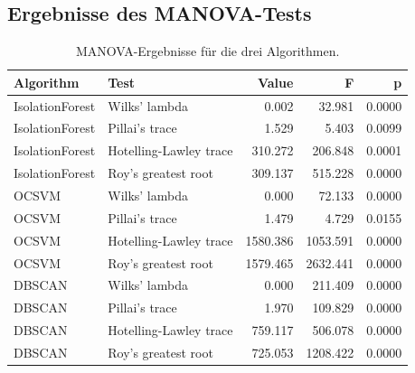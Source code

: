 \documentclass[a4paper,12pt]{article}
\begin{document}
	\subsection{Ergebnisse des MANOVA-Tests}
	\begin{table}[H]
		\centering
		\begin{tabular}{l l r r r}
			\hline
			Algorithm & Test & Value & F & p \\
			\hline
			IsolationForest & Wilks' lambda & 0.002 & 32.981 & 0.0000 \\
			IsolationForest & Pillai's trace & 1.529 & 5.403 & 0.0099 \\
			IsolationForest & Hotelling-Lawley trace & 310.272 & 206.848 & 0.0001 \\
			IsolationForest & Roy's greatest root & 309.137 & 515.228 & 0.0000 \\
			\hline
			OCSVM & Wilks' lambda & 0.000 & 72.133 & 0.0000 \\
			OCSVM & Pillai's trace & 1.479 & 4.729 & 0.0155 \\
			OCSVM & Hotelling-Lawley trace & 1580.386 & 1053.591 & 0.0000 \\
			OCSVM & Roy's greatest root & 1579.465 & 2632.441 & 0.0000 \\
			\hline
			DBSCAN & Wilks' lambda & 0.000 & 211.409 & 0.0000 \\
			DBSCAN & Pillai's trace & 1.970 & 109.829 & 0.0000 \\
			DBSCAN & Hotelling-Lawley trace & 759.117 & 506.078 & 0.0000 \\
			DBSCAN & Roy's greatest root & 725.053 & 1208.422 & 0.0000 \\
			\hline
		\end{tabular}
		\caption{MANOVA-Ergebnisse für die drei Algorithmen.}
		\label{tab:manova_results}
	\end{table}
	
\end{document}
